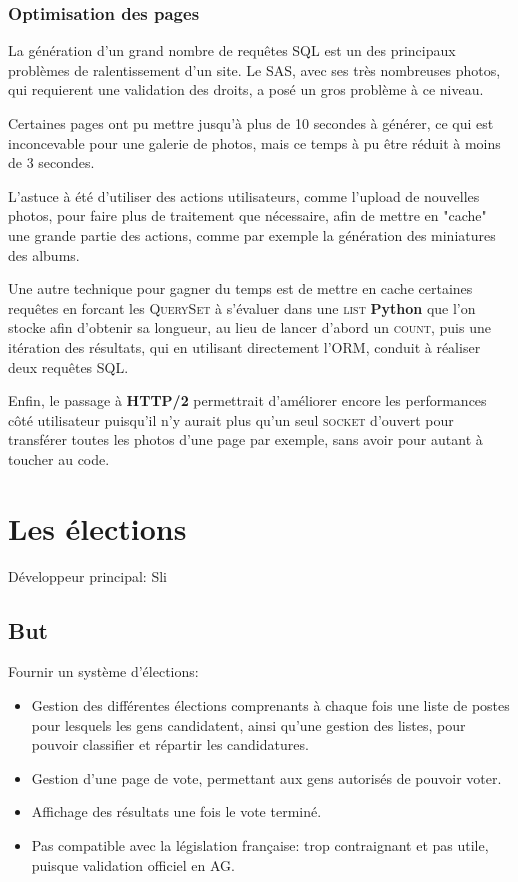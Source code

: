 \documentclass[a4paper]{report}
\begin{document}
\subsection{Optimisation des pages}
\label{sub:optimisation_des_pages}
\par La génération d'un grand nombre de requêtes SQL est un des principaux problèmes de ralentissement d'un site. Le
SAS, avec ses très nombreuses photos, qui requierent une validation des droits, a posé un gros problème à ce niveau.

\par Certaines pages ont pu mettre jusqu'à plus de 10 secondes à générer, ce qui est inconcevable pour une galerie de
photos, mais ce temps à pu être réduit à moins de 3 secondes.

\par L'astuce à été d'utiliser des actions utilisateurs, comme l'upload de nouvelles photos, pour faire plus de
traitement que nécessaire, afin de mettre en "cache" une grande partie des actions, comme par exemple la génération des
miniatures des albums.

\par Une autre technique pour gagner du temps est de mettre en cache certaines requêtes en forcant les \textsc{QuerySet}
à s'évaluer dans une \textsc{list} \textbf{Python} que l'on stocke afin d'obtenir sa longueur, au lieu de lancer d'abord
un \textsc{count}, puis une itération des résultats, qui en utilisant directement l'ORM, conduit à réaliser deux
requêtes SQL.

\par Enfin, le passage à \textbf{HTTP/2} permettrait d'améliorer encore les performances côté utilisateur puisqu'il n'y
aurait plus qu'un seul \textsc{socket} d'ouvert pour transférer toutes les photos d'une page par exemple, sans avoir
pour autant à toucher au code.


\chapter{Les élections}
\label{sec:les_elections}
\par Développeur principal: Sli

\section{But}
\label{sub:but}
\par Fournir un système d'élections:
\begin{itemize}
    \item Gestion des différentes élections comprenants à chaque fois une liste de postes pour lesquels les gens
        candidatent, ainsi qu'une gestion des listes, pour pouvoir classifier et répartir les candidatures.
    \item Gestion d'une page de vote, permettant aux gens autorisés de pouvoir voter.
    \item Affichage des résultats une fois le vote terminé.
    \item Pas compatible avec la législation française: trop contraignant et pas utile, puisque validation officiel en
        AG.
\end{itemize}
\end{document}
